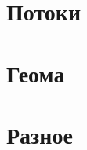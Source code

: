 \documentclass[a4paper,twocolumn,8pt]{extarticle}
\begin{document}
    \section{Потоки}
    
    

    \section{Геома}
    
    \section{Разное}
    

\end{document}

